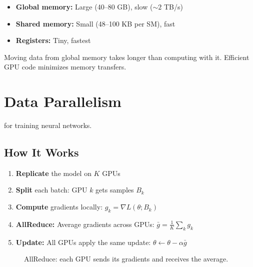 \begin{itemize}
    \item \textbf{Global memory:} Large (40--80 GB), slow ($\sim 2$ TB/s)
    \item \textbf{Shared memory:} Small (48--100 KB per SM), fast
    \item \textbf{Registers:} Tiny, fastest
\end{itemize}

 Moving data from global memory takes longer than computing with it. Efficient GPU code minimizes memory transfers.





\newpage
\section{Data Parallelism}

 for training neural networks.

\subsection{How It Works}

\begin{enumerate}
    \item \textbf{Replicate} the model on $K$ GPUs
    \item \textbf{Split} each batch: GPU $k$ gets samples $B_k$
    \item \textbf{Compute} gradients locally: $g_k = \nabla L(\theta; B_k)$
    \item \textbf{AllReduce:} Average gradients across GPUs: $\bar{g} = \frac{1}{K}\sum_k g_k$
    \item \textbf{Update:} All GPUs apply the same update: $\theta \leftarrow \theta - \alpha \bar{g}$
\end{enumerate}

\begin{figure}[h]
    \centering
    \caption{AllReduce: each GPU sends its gradients and receives the average.}
    \label{fig:allreduce}
\end{figure}


